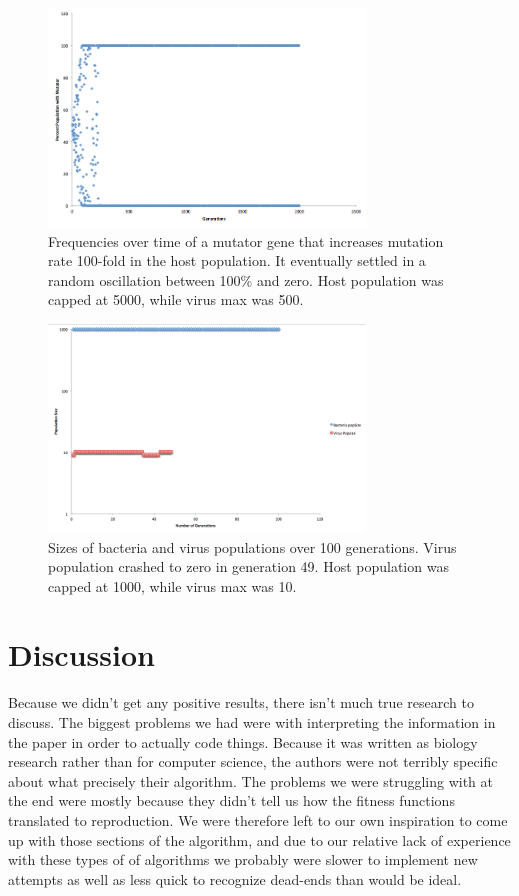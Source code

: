 \documentclass[11pt, oneside]{article}
\begin{document}
\begin{figure}[H]
	\centering
	\includegraphics[width=0.75\textwidth]{figure3.png}
	\caption{Frequencies over time of a mutator gene that increases mutation rate 100-fold in the host population. It eventually settled in a random oscillation between 100\% and zero. Host population was capped at 5000, while virus max was 500.}
\end{figure}

\begin{figure}[H]
	\centering
	\includegraphics[width=0.75\textwidth]{figure4.png}
	\caption{Sizes of bacteria and virus populations over 100 generations. Virus population crashed to zero in generation 49. Host population was capped at 1000, while virus max was 10.}
\end{figure}

\section{Discussion}
Because we didn't get any positive results, there isn't much true research to discuss. The biggest problems we had were with interpreting the information in the paper in order to actually code things. Because it was written as biology research rather than for computer science, the authors were not terribly specific about what precisely their algorithm. The problems we were struggling with at the end were mostly because they didn't tell us how the fitness functions translated to reproduction. We were therefore left to our own inspiration to come up with those sections of the algorithm, and due to our relative lack of experience with these types of of algorithms we probably were slower to implement new attempts as well as less quick to recognize dead-ends than would be ideal.
\end{document}

